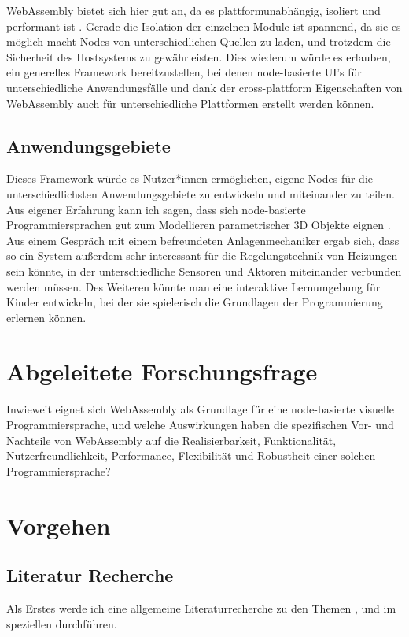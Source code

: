 \documentclass[ngerman]{article}
\begin{document}
\linebreak
\linebreak
WebAssembly bietet sich hier gut an, da es plattformunabhängig, isoliert und performant ist \cite{Haas2017}. Gerade die Isolation der einzelnen Module ist spannend, da sie es möglich macht Nodes von unterschiedlichen Quellen zu laden, und trotzdem die Sicherheit des Hostsystems zu gewährleisten.
\linebreak
\linebreak
Dies wiederum würde es erlauben, ein generelles Framework bereitzustellen, bei denen node-basierte UI's für unterschiedliche Anwendungsfälle und dank der cross-plattform Eigenschaften von WebAssembly auch für unterschiedliche Plattformen erstellt werden können.
\linebreak
\linebreak
\subsection{Anwendungsgebiete}
Dieses Framework würde es Nutzer*innen ermöglichen, eigene Nodes für die unterschiedlichsten Anwendungsgebiete zu entwickeln und miteinander zu teilen. Aus eigener Erfahrung kann ich sagen, dass sich node-basierte Programmiersprachen gut zum Modellieren parametrischer 3D Objekte eignen \cite{Plantarium}. Aus einem Gespräch mit einem befreundeten Anlagenmechaniker ergab sich, dass so ein System außerdem sehr interessant für die Regelungstechnik von Heizungen sein könnte, in der unterschiedliche Sensoren und Aktoren miteinander verbunden werden müssen. Des Weiteren könnte man eine interaktive Lernumgebung für Kinder entwickeln, bei der sie spielerisch die Grundlagen der Programmierung erlernen können.

\section{Abgeleitete Forschungsfrage}
Inwieweit eignet sich WebAssembly als Grundlage für eine node-basierte visuelle Programmiersprache, und welche Auswirkungen haben die spezifischen Vor- und Nachteile von WebAssembly auf die Realisierbarkeit, Funktionalität, Nutzerfreundlichkeit, Performance, Flexibilität und Robustheit einer solchen Programmiersprache?

\section{Vorgehen}
\subsection{Literatur Recherche}
Als Erstes werde ich eine allgemeine Literaturrecherche zu den Themen ,  und im speziellen  durchführen.
\end{document}
